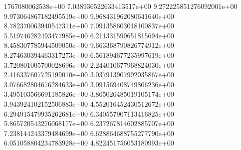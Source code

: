 1767080062538e+00	7.038936522633413517e+00	9.272225851276092001e+00	9.973064867182495519e+00	9.968431962080641640e+00	8.782370063940547311e+00	7.091358603018100837e+00	5.519746282493477985e+00	6.211331599651815694e+00	8.458307785944509050e+00	9.663368790826774912e+00	8.274630394463317273e+00	6.561894677235997619e+00	3.720801005700028696e+00	2.244010677968824030e+00	2.416337607725199010e+00	3.037913907992035867e+00	3.076682804676284633e+00	3.091569408749806236e+00	3.495103566691185826e+00	3.865026485019105174e+00	3.943924102152506883e+00	4.552016452430512672e+00	6.294915479935262681e+00	6.340557907113416825e+00	5.865720543276068177e+00	6.237267814602885707e+00	7.238144243379484699e+00	6.628864688755277790e+00	6.051058804234783928e+00	4.822451756053180993e+00
